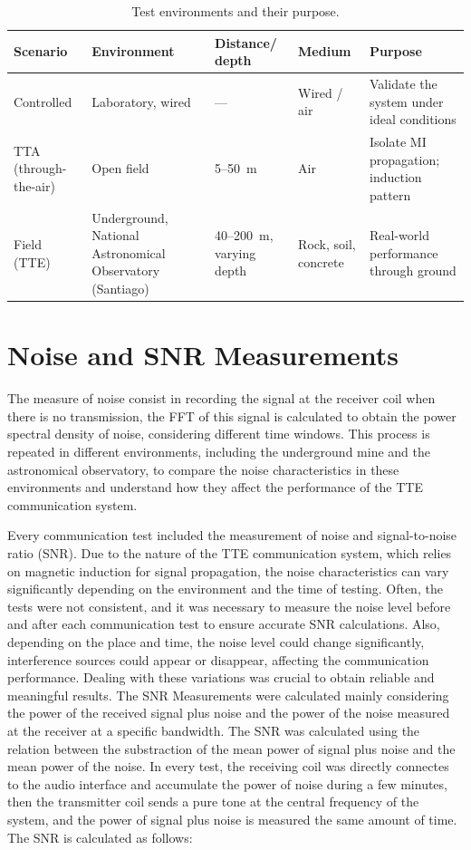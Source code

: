 \begin{table}[H]
  \centering
  \caption{Test environments and their purpose.}
  \label{tab:scenarios}
  \begin{tabular}{p{} p{} p{} p{} p{}}
    \toprule
    \textbf{Scenario} & \textbf{Environment} & \textbf{Distance/ depth} &
    \textbf{Medium} & \textbf{Purpose} \\
    \midrule
    Controlled & Laboratory, wired & --- & Wired / air &
      Validate the system under ideal conditions \\
    TTA (through-the-air) & Open field & 5--50~m & Air &
      Isolate MI propagation; induction pattern \\
    Field (TTE) & Underground, National Astronomical Observatory (Santiago) &
      40--200~m, varying depth & Rock, soil, concrete &
      Real-world performance through ground \\
    \bottomrule
  \end{tabular}
\end{table}

\section{Noise and SNR Measurements}

The measure of noise consist in recording the signal at the receiver coil when there is no transmission, the FFT of this signal is calculated to obtain the power spectral density of noise, considering different time windows. This process is repeated in different environments, including the underground mine and the astronomical observatory, to compare the noise characteristics in these environments and understand how they affect the performance of the TTE communication system.
\newp

Every communication test included the measurement of noise and signal-to-noise ratio (SNR). Due to the nature of the TTE communication system, which relies on magnetic induction for signal propagation, the noise characteristics can vary significantly depending on the environment and the time of testing. Often, the tests were not consistent, and it was necessary to measure the noise level before and after each communication test to ensure accurate SNR calculations. Also, depending on the place and time, the noise level could change significantly, interference sources could appear or disappear, affecting the communication performance. Dealing with these variations was crucial to obtain reliable and meaningful results.
\newp
The SNR Measurements were calculated mainly considering the power of the received signal plus noise and the power of the noise measured at the receiver at a specific bandwidth. The SNR was calculated using the relation between the substraction of the mean power of signal plus noise and the mean power of the noise. In every test, the receiving coil was directly connectes to the audio interface and accumulate the power of noise during a few minutes, then the transmitter coil sends a pure tone at the central frequency of the system, and the power of signal plus noise is measured the same amount of time. The SNR is calculated as follows:

